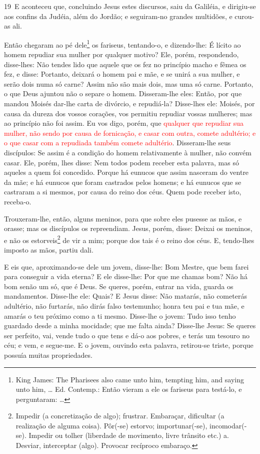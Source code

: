 \medskip

\lettrine{19}\ E aconteceu que, concluindo Jesus estes
discursos, saiu da Galiléia, e dirigiu-se aos confins da Judéia,
além do Jordão; e seguiram-no grandes multidões, e curou-as
ali.

Então chegaram ao pé dele\footnote{King James: The Pharisees also
came unto him, tempting him, and saying unto him, \ldots{} Ed.
Contemp.: Então vieram a ele os fariseus para testá-lo, e
perguntaram: \ldots{}} os fariseus, tentando-o, e dizendo-lhe: É
lícito ao homem repudiar sua mulher por qualquer motivo? Ele,
porém, respondendo, disse-lhes: Não tendes lido que aquele que os
fez no princípio macho e fêmea os fez, e disse: Portanto,
deixará o homem pai e mãe, e se unirá a sua mulher, e serão dois
numa só carne? Assim não são mais dois, mas uma só carne.
Portanto, o que Deus ajuntou não o separe o homem. Disseram-lhe
eles: Então, por que mandou Moisés dar-lhe carta de divórcio, e
repudiá-la? Disse-lhes ele: Moisés, por causa da dureza dos
vossos corações, vos permitiu repudiar vossas mulheres; mas ao
princípio não foi assim. Eu vos digo, porém, que
\textcolor{red}{qualquer que repudiar sua mulher, não sendo por causa de
fornicação, e casar com outra, comete adultério; e o que casar com a
repudiada também comete adultério}. Disseram-lhe seus
discípulos: Se assim é a condição do homem relativamente à mulher,
não convém casar. Ele, porém, lhes disse: Nem todos podem
receber esta palavra, mas só aqueles a quem foi concedido.
Porque há eunucos que assim nasceram do ventre da mãe; e há
eunucos que foram castrados pelos homens; e há eunucos que se
castraram a si mesmos, por causa do reino dos céus. Quem pode
receber isto, receba-o.

Trouxeram-lhe, então, alguns meninos, para que sobre eles pusesse
as mãos, e orasse; mas os discípulos os repreendiam. Jesus,
porém, disse: Deixai os meninos, e não os estorveis\footnote{Impedir
(a concretização de algo); frustrar. Embaraçar, dificultar (a
realização de alguma coisa).  Pôr(-se) estorvo; importunar(-se),
incomodar(-se). Impedir ou tolher (liberdade de movimento, livre
trânsito etc.) a. Desviar, interceptar (algo). Provocar recíproco
embaraço.} de vir a mim; porque dos tais é o reino dos céus.
E, tendo-lhes imposto as mãos, partiu dali.

E eis que, aproximando-se dele um jovem, disse-lhe: Bom Mestre,
que bem farei para conseguir a vida eterna? E ele disse-lhe:
Por que me chamas bom? Não há bom senão um só, que é Deus. Se
queres, porém, entrar na vida, guarda os mandamentos.
Disse-lhe ele: Quais? E Jesus disse: Não matarás, não
cometerás adultério, não furtarás, não dirás falso testemunho;
honra teu pai e tua mãe, e amarás o teu próximo como a ti
mesmo. Disse-lhe o jovem: Tudo isso tenho guardado desde a
minha mocidade; que me falta ainda? Disse-lhe Jesus: Se
queres ser perfeito, vai, vende tudo o que tens e dá-o aos pobres, e
terás um tesouro no céu; e vem, e segue-me. E o jovem,
ouvindo esta palavra, retirou-se triste, porque possuía muitas
propriedades.

